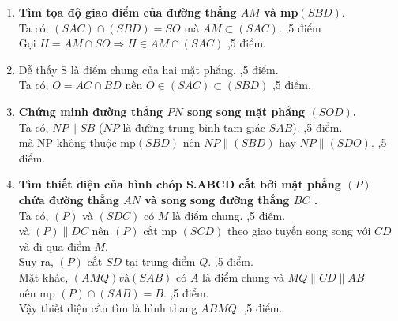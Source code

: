 \begin{ex}
{\begin{center}
\begin{tikzpicture}
				\end{tikzpicture}	
			\end{center}	
			\begin{enumerate}
				\item \textbf{Tìm tọa độ giao điểm của đường thẳng $ AM $ và mp$ (SBD) $}.\\
				Ta có, $ (SAC)\cap (SBD)=SO $ mà $ AM \subset(SAC)  $. ,5 điểm\\
				Gọi $ H=AM \cap SO \Rightarrow H \in AM \cap (SAC) $ ,5 điểm.
				\item Dễ thấy S là điểm chung của hai mặt phẳng. ,5 điểm.\\
				Ta có, $ O=AC\cap BD  $ nên $ O \in (SAC) \subset (SBD) $ ,5 điểm.
				\item \textbf{Chứng minh đường thẳng $ PN $ song song mặt phẳng $ (SOD) $.} \\
				Ta có, $ NP \parallel SB $  ($ NP $ là đường trung bình tam giác $ SAB $). ,5 điểm. \\
				mà NP không thuộc mp$ (SBD) $ nên $NP \parallel  (SBD) $  hay $NP \parallel (SDO) $. ,5 điểm.
				\item \textbf{Tìm thiết diện của hình chóp S.ABCD cắt bởi mặt phẳng $ (P) $ chứa đường thẳng $ AN $ và song song đường thẳng $ BC $ .}	\\
				Ta có, $ (P) $ và $ (SDC) $ có $ M $ là điểm chung. ,5 điểm. \\
				và 	$ (P) \parallel {DC} $ nên $ (P) $ cắt mp $ (SCD) $ theo giao tuyến song song với $ CD $ và đi qua điểm $ M $. \\
				Suy ra, $ (P) $ cắt $ SD $ tại trung điểm $Q$. ,5 điểm.\\
				Mặt khác, $ (AMQ) và (SAB)$ có $ A $ là điểm chung và $MQ \parallel CD \parallel AB $ \\
				nên mp $ (P) \cap (SAB) = B$. ,5 điểm. \\
				Vậy thiết diện cần tìm là hình thang $ ABMQ $. ,5 điểm.
			\end{enumerate}	
		}
	\end{ex}
